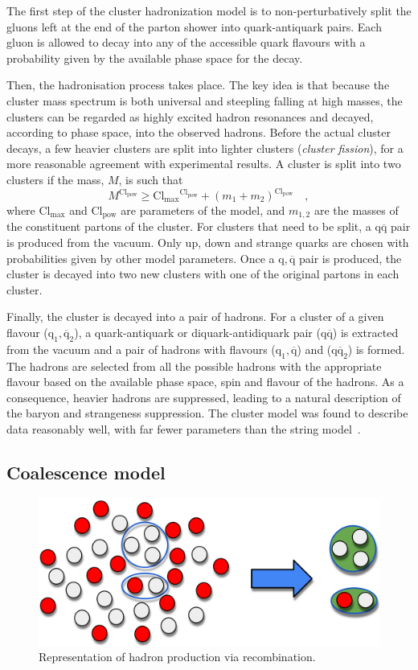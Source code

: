 The first step of the cluster hadronization model is to non-perturbatively split the gluons left at the end of the parton shower into quark-antiquark pairs. Each gluon is allowed to decay into any of the accessible quark flavours with a probability given by the available phase space for the decay. 

Then, the hadronisation process takes place. The key idea is that because the cluster mass spectrum is both universal and steepling falling at high masses, the clusters can be regarded as highly excited hadron resonances and decayed, according to phase space, into the observed hadrons. Before the actual cluster decays, a few heavier clusters are split into lighter clusters (\emph{cluster fission}), for a more reasonable agreement with experimental results. A cluster is split into two clusters if the mass, $M$, is such that
\begin{equation*}
    M^{\mathrm{Cl_{pow}}} \geq \mathrm{Cl_{max} {}^{Cl_{pow}}} + (m_1+m_2)^{\mathrm{Cl_{pow}}}\quad ,
\end{equation*}
where $\mathrm{Cl_{max}}$ and $\mathrm{Cl_{pow}}$ are parameters of the model, and $m_{1,2}$ are the masses of the constituent partons of the cluster. For clusters that need to be split, a $\mathrm{q\overline{q}}$ pair is produced from the vacuum. Only up, down and strange quarks are chosen with probabilities given by other model parameters. Once a $\mathrm{q, \overline{q}}$ pair is produced, the cluster is decayed into two new clusters with one of the original partons in each cluster. 

Finally, the cluster is decayed into a pair of hadrons. For a cluster of a given flavour ($\mathrm{q_1, \overline{q}_2}$), a quark-antiquark or diquark-antidiquark pair ($\mathrm{q\overline{q}}$) is extracted from the vacuum and a pair of hadrons with flavours ($\mathrm{q_1, \overline{q}}$) and ($\mathrm{q\overline{q}_2}$) is formed. The hadrons are selected from all the possible hadrons with the appropriate flavour based on the available phase space, spin and flavour of the hadrons. As a consequence, heavier hadrons are suppressed, leading to a natural description of the baryon and strangeness suppression. The cluster model was found to describe data reasonably well, with far fewer parameters than the string model~\cite{Seymour:2013ega}.

\subsection{Coalescence model}
\begin{figure}[htb]
    \centering
    \includegraphics[width=0.7\linewidth]{Figures/Chapter 2/Coalescence.png}
    \caption{Representation of hadron production via recombination.}
\end{figure}

